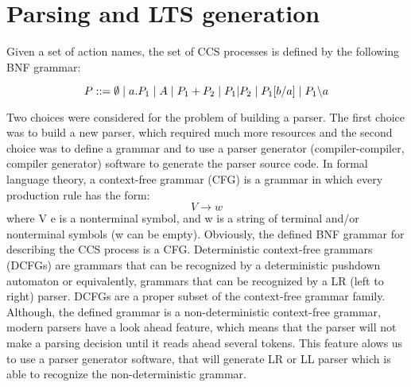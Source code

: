 \section{Parsing and LTS generation}

Given a set of action names, the set of CCS processes is defined by the following BNF grammar:

\begin{equation}\label{eq:ccs_bnf}
P ::= \emptyset \hspace{1 mm} | \hspace{1 mm} a.P_{1} \hspace{1 mm} | \hspace{1 mm} A \hspace{1 mm} | \hspace{1 mm}P_{1}+P_{2} \hspace{1 mm} |
\hspace{1 mm} P_{1} | P_{2} \hspace{1 mm} | \hspace{1 mm} P_{1}[b/a] \hspace{1 mm} | \hspace{1 mm} P_{1} \backslash a
\end{equation}

Two choices were considered for the problem of building a parser. The first choice was to build
a new parser, which required much more resources and the second choice was to define a grammar
and to use a parser generator (compiler-compiler, compiler generator) software to generate the parser source code.
In formal language theory, a context-free grammar (CFG) is a grammar in which every production 
rule has the form:
\[V \rightarrow w \]
where V e is a nonterminal symbol, and w is a string of terminal and/or nonterminal symbols 
(w can be empty). Obviously, the defined BNF grammar for describing the CCS process is a CFG. 
Deterministic context-free grammars (DCFGs) are grammars that can be recognized by a 
deterministic pushdown automaton or equivalently, grammars that can be recognized by a LR (left to right) parser. 
DCFGs are a proper subset of the context-free grammar family. Although, the defined grammar is 
a non-deterministic context-free grammar, modern parsers have a look ahead feature, which means that
the parser will not make a parsing decision until it reads ahead several tokens. This feature
alows us to use a parser generator software, that will generate LR or LL parser which is able to
recognize the non-deterministic grammar.

